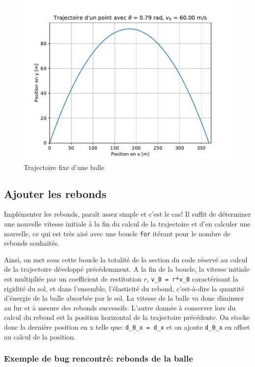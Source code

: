 \documentclass[a4paper,11pt]{article}
\begin{document}
\begin{figure}[H]
	\centering
	\includegraphics[scale=0.5]{Figures/imgtraject_fixe.pdf}
	\caption{Trajectoire fixe d'une balle}
	\label{fig:traject} 
\end{figure}

\subsection{Ajouter les rebonds}

Implémenter les rebonds, paraît assez simple et c'est le cas! Il suffit de déterminer une nouvelle vitesse initiale à la fin du calcul de la trajectoire et d'en calculer une nouvelle, ce qui est très aisé avec une boucle \verb|for| itérant pour le nombre de rebonds souhaités.

Ainsi, on met sous cette boucle la totalité de la section du code réservé au calcul de la trajectoire développé précédemment. A la fin de la boucle, la vitesse initiale est multipliée par un coefficient de restitution $r$, \verb|v_0 = r*v_0| caractérisant la rigidité du sol, et dans l'ensemble, l'élasticité du rebond, c'est-à-dire la quantité d'énergie de la balle absorbée par le sol. La vitesse de la balle va donc diminuer au fur et à mesure des rebonds successifs. L'autre donnée à conserver lors du calcul du rebond est la position horizontal de la trajectoire précédente. On stocke donc la dernière position en x telle que: \verb|d_0_x = d_x| et on ajoute \verb|d_0_x| en offset au calcul de la position. 


\subsubsection{Exemple de bug rencontré: rebonds de la balle}
\end{document}
